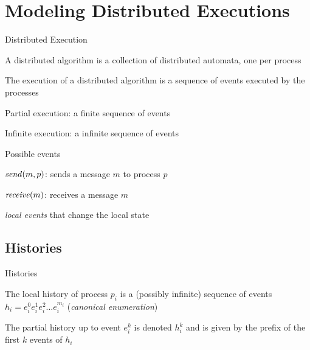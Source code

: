 \section{Modeling Distributed Executions}

\begin{frame}[shrink=5]{Distributed Execution}

\begin{definition}
A \alert{distributed algorithm} is a collection of distributed automata,
one per process
\end{definition}
\vfill
\begin{definition}
	The \alert{execution} of a distributed algorithm is a sequence of \alert{events} executed
  by the processes
  \BI
  \item \alert{Partial execution}: a finite sequence of events
  \item \alert{Infinite execution}: a infinite sequence of events
  \EI
\end{definition}
\vfill
\begin{block}{Possible events}
  \BI
   \item $\mathit{send}(m,p)$: sends a message $m$ to process $p$
   \item $\mathit{receive}(m)$: receives a message $m$
   \item {\em local events} that change the local state
  \EI
\end{block}
\end{frame}

\subsection{Histories}

\begin{frame}{Histories}
	
\begin{definition}
The \alert{local history} of process $p_i$ is a (possibly infinite)
  sequence of events $h_i = e^0_i e^1_i e^2_i \ldots e^{m_i}_i$ (\emph{canonical enumeration})
\end{definition}
\vfill
\begin{definition}
The \alert{partial history} up to event $e^k_i$ is denoted $h^k_i$ and
  is given by the prefix of the first $k$ events of $h_i$
\end{definition}
\vfill

\end{frame}

